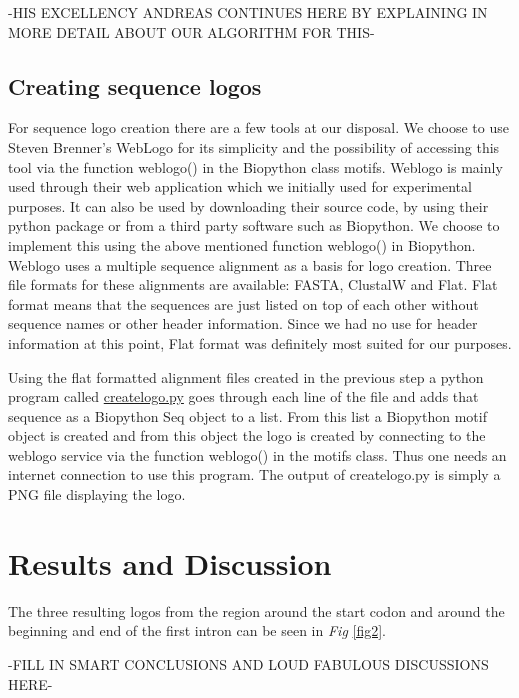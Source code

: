 \documentclass[10pt,letterpaper]{article}
\begin{document}
-HIS EXCELLENCY ANDREAS CONTINUES HERE BY EXPLAINING IN MORE DETAIL ABOUT OUR ALGORITHM FOR THIS-

\subsection*{Creating sequence logos}
For sequence logo creation there are a few tools at our disposal. We choose to use Steven Brenner's WebLogo \cite{bib6} for its simplicity and the possibility of accessing this tool via the function weblogo() in the Biopython class motifs. Weblogo is mainly used through their web application which we initially used for experimental purposes. It can also be used by downloading their source code, by using their python package or from a third party software such as Biopython. We choose to implement this using the above mentioned function weblogo() in Biopython. Weblogo uses a multiple sequence alignment as a basis for logo creation. Three file formats for these alignments are available: FASTA, ClustalW and Flat. Flat format means that the sequences are just listed on top of each other without sequence names or other header information. Since we had no use for header information at this point, Flat format was definitely most suited for our purposes. 

Using the flat formatted alignment files created in the previous step a python program called \href{https://github.com/jolo2486/unravel_motifs/blob/master/bin/createlogo.py}{createlogo.py} goes through each line of the file and adds that sequence as a Biopython Seq object to a list. From this list a Biopython motif object is created and from this object the logo is created by connecting to the weblogo service via the function weblogo() in the motifs class. Thus one needs an internet connection to use this program. The output of createlogo.py is simply a PNG file displaying the logo.

\section*{Results and Discussion}
The three resulting logos from the region around the start codon and around the beginning and end of the first intron can be seen in \textit{Fig} \ref{fig2}.

-FILL IN SMART CONCLUSIONS AND LOUD FABULOUS DISCUSSIONS HERE-
\end{document}
